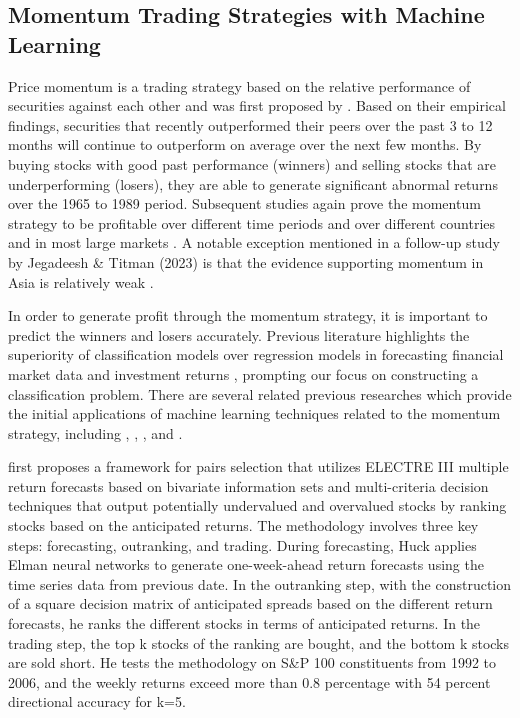 \documentclass{article}
\begin{document}
\subsection{Momentum Trading Strategies with Machine Learning}
Price momentum is a trading strategy based on the relative performance of securities against each other and was first proposed by \cite{jegadeesh1993returns}. Based on their empirical findings, securities that recently outperformed their peers over the past 3 to 12 months will continue to outperform on average over the next few months. By buying stocks with good past performance (winners) and selling stocks that are underperforming (losers), they are able to generate significant abnormal returns over the 1965 to 1989 period. Subsequent studies again prove the momentum strategy to be profitable over different time periods \citep{chan1999profitability, jegadeesh2001profitability, jegadeesh2023momentum} and over different countries and in most large markets \citep{rouwenhorst1998international}. A notable exception mentioned in a follow-up study by Jegadeesh \& Titman (2023) is that the evidence supporting momentum in Asia is relatively weak \citep{jegadeesh2023momentum}.

In order to generate profit through the momentum strategy, it is important to predict the winners and losers accurately. Previous literature highlights the superiority of classification models over regression models in forecasting financial market data and investment returns \citep{leung2000forecasting}, prompting our focus on constructing a classification problem. There are several related previous researches which provide the initial applications of machine learning techniques related to the momentum strategy, including \cite{huck2009pairs}, \cite{moritz2016tree}, \cite{takeuchi2013applying}, \cite{krauss2017deep} and \cite{fischer2018deep}.

\cite{huck2009pairs} first proposes a framework for pairs selection that utilizes ELECTRE III multiple return forecasts based on bivariate information sets and multi-criteria decision techniques that output potentially undervalued and overvalued stocks by ranking stocks based on the anticipated returns. The methodology involves three key steps: forecasting, outranking, and trading. During forecasting, Huck applies Elman neural networks to generate one-week-ahead return forecasts using the time series data from previous date. In the outranking step, with the construction of a square decision matrix of anticipated spreads based on the different return forecasts, he ranks the different stocks in terms of anticipated returns. In the trading step, the top k stocks of the ranking are bought, and the bottom k stocks are sold short. He tests the methodology on S\&P 100 constituents from 1992 to 2006, and the weekly returns exceed more than 0.8 percentage with 54 percent directional accuracy for k=5.
\end{document}
